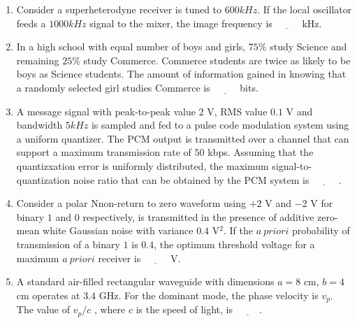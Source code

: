 \documentclass[journal,12pt,onecolumn]{IEEEtran}
\theoremstyle{remark}
\begin{document}
\begin{enumerate}
\hfill {}

\item Consider a superheterodyne receiver is tuned to $600 kHz$. If the local oscillator feeds a $1000 kHz$ signal to the mixer, the image frequency  is $\underline{\hspace{1cm}}$ kHz.  

\hfill {}

\item In a high school with equal number of boys and girls, $75\%$ study Science and remaining  $25\%$ study Commerce. Commerce students are twice as likely to be boys as Science students.  
The amount of information gained in knowing that a randomly selected girl studies Commerce  is $\underline{\hspace{1cm}}$  bits.

\hfill {}

\item A message signal with peak-to-peak value $2$ V, RMS value $0.1$ V and bandwidth $5 kHz$ is sampled and fed to a pulse code modulation  system using a uniform quantizer. The PCM output is transmitted over a channel that can support a maximum transmission rate of $50$ kbps.  
Assuming that the quantizxation error is uniformly distributed, the maximum signal-to-quantization noise ratio that can be obtained by the PCM system is $\underline{\hspace{1cm}}$ . 

\hfill {}

\item Consider a polar Nnon-return to zero  waveform using $+2$ V and $-2$ V for binary $1$ and $0$ respectively, is transmitted in the presence of additive zero-mean white Gaussian noise with variance $0.4$ V$^2$. If the $a \ priori$ probability of transmission of a binary $1$ is $0.4$,  
the optimum threshold voltage for a maximum $a \ priori$  receiver  is $\underline{\hspace{1cm}}$ V.  

\hfill {}

\item A standard air-filled rectangular waveguide with dimensions $a = 8$ cm, $b = 4$ cm operates at $3.4$ GHz. For the dominant mode, the phase velocity is $v_p$.  
The value of $v_p/c$  , where $c$ is the speed of light, is  $\underline{\hspace{1cm}}$.


\end{enumerate}
\end{document}
